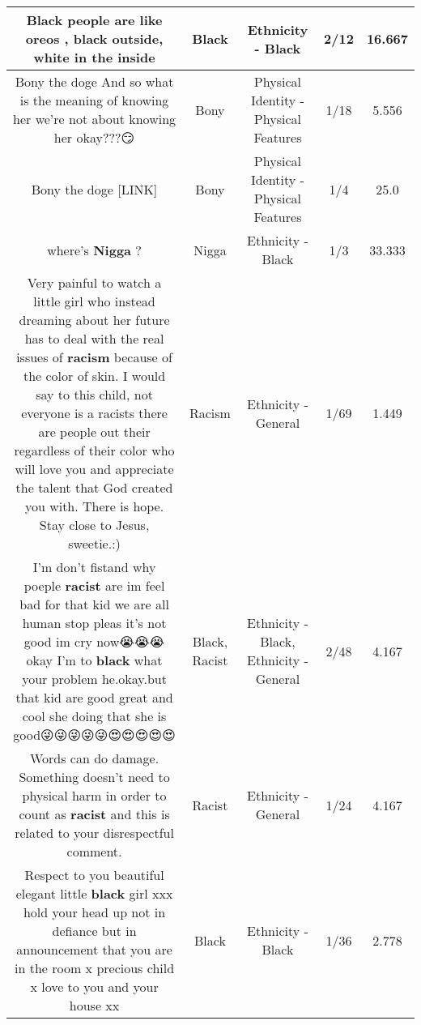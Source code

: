 \documentclass[11pt]{article}
\newlength\mylength
\begin{document}
\begin{center}
\begin{longtable}{|C{.65\mylength}|C{.30\mylength}|C{.12\mylength}|C{.12\mylength}|C{.12\mylength}|}
  \small Black people are like oreos , \textbf{black} outside, white in the inside\normalsize   & Black & Ethnicity - Black & 2/12 & 16.667 \\  \hline
  \small Bony the doge And so what is the meaning of knowing her we're not about knowing her okay???😏\normalsize   & Bony & Physical Identity - Physical Features & 1/18 & 5.556 \\  \hline
  \small Bony the doge  [LINK] \normalsize   & Bony & Physical Identity - Physical Features & 1/4 & 25.0 \\  \hline
  \small where's \textbf{Nigga} ?\normalsize   & Nigga & Ethnicity - Black & 1/3 & 33.333 \\  \hline
  \small Very painful to watch a little girl who instead dreaming about her future has to deal with the real issues of \textbf{racism} because of the color of skin.  I would say to this child, not everyone is a racists there are people out their regardless of their color who will love you and appreciate the talent that God created you with.  There is hope.  Stay close to Jesus, sweetie.:)\normalsize   & Racism & Ethnicity - General & 1/69 & 1.449 \\  \hline
  \small I'm don't fistand why poeple \textbf{racist} are im feel bad for that kid we are all human stop pleas it's not good im cry now😭😭😭 okay I'm to \textbf{black} what your problem he.okay.but that kid are good great and cool she doing that she is  good😜😜😜😜😜😍😍😍😍😍\normalsize   & Black, Racist & Ethnicity - Black, Ethnicity - General & 2/48 & 4.167 \\  \hline
  \small Words can do damage. Something doesn't need to physical harm in order to count as \textbf{racist} and this is related to your disrespectful comment.\normalsize   & Racist & Ethnicity - General & 1/24 & 4.167 \\  \hline
  \small Respect to you beautiful elegant little \textbf{black} girl xxx hold your head up not in defiance but in announcement that you are in the room x precious child x love to you and your house xx\normalsize   & Black & Ethnicity - Black & 1/36 & 2.778 \\  \hline

\end{longtable}
\end{center}
\end{document}
